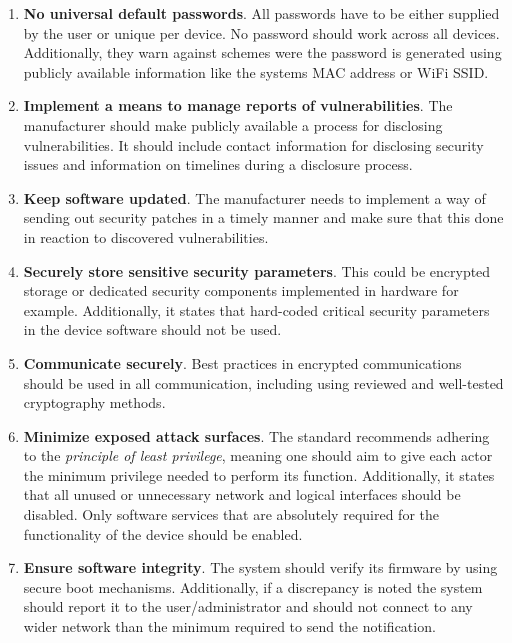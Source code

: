 \begin{enumerate}
    \item \textbf{No universal default passwords}. All passwords have to be either supplied by the user or unique per device. No password should work across all devices. Additionally, they warn against schemes were the password is generated using publicly available information like the systems MAC address or WiFi SSID.
    
    \item \textbf{Implement a means to manage reports of vulnerabilities}. The manufacturer should make publicly available a process for disclosing vulnerabilities. It should include contact information for disclosing security issues and information on timelines during a disclosure process.
    
    \item \textbf{Keep software updated}. The manufacturer needs to implement a way of sending out security patches in a timely manner and make sure that this done in reaction to discovered vulnerabilities.
    
    \item \textbf{Securely store sensitive security parameters}. This could be encrypted storage or dedicated security components implemented in hardware for example. Additionally, it states that hard-coded critical security parameters in the device software should not be used.
    
    \item \textbf{Communicate securely}. Best practices in encrypted communications should be used in all communication, including using reviewed and well-tested cryptography methods.
    
    \item \textbf{Minimize exposed attack surfaces}. The standard recommends adhering to the \textit{principle of least privilege}, meaning one should aim to give each actor the minimum privilege needed to perform its function. Additionally, it states that all unused or unnecessary network and logical interfaces should be disabled. Only software services that are absolutely required for the functionality of the device should be enabled.
    
    \item \textbf{Ensure software integrity}. The system should verify its firmware by using secure boot mechanisms. Additionally, if a discrepancy is noted the system should report it to the user/administrator and should not connect to any wider network than the minimum required to send the notification.
    

\end{enumerate}
